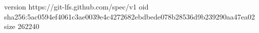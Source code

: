 version https://git-lfs.github.com/spec/v1
oid sha256:5ac0594ef4061c3ae0039e4c4272682ebdbede078b28536d9b239290aa47ea02
size 262240
